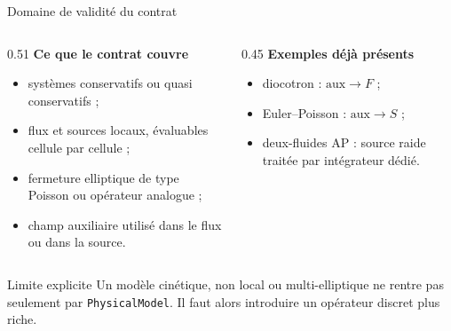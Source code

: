 \documentclass[10pt,aspectratio=169]{beamer}
\newcommand{\code}[1]{\texttt{\footnotesize #1}}
\begin{document}
\begin{frame}{Domaine de validité du contrat}
  \begin{columns}[T,onlytextwidth]
    \begin{column}{0.51\textwidth}
      \textbf{Ce que le contrat couvre}
      \begin{itemize}
        \item systèmes conservatifs ou quasi conservatifs ;
        \item flux et sources locaux, évaluables cellule par cellule ;
        \item fermeture elliptique de type Poisson ou opérateur analogue ;
        \item champ auxiliaire utilisé dans le flux ou dans la source.
      \end{itemize}
    \end{column}
    \begin{column}{0.45\textwidth}
      \textbf{Exemples déjà présents}
      \begin{itemize}
        \item diocotron : \(\mathrm{aux}\rightarrow F\) ;
        \item Euler--Poisson : \(\mathrm{aux}\rightarrow S\) ;
        \item deux-fluides AP : source raide traitée par intégrateur dédié.
      \end{itemize}
    \end{column}
  \end{columns}

  \vspace{0.35cm}
  \begin{block}{Limite explicite}
    Un modèle cinétique, non local ou multi-elliptique ne rentre pas seulement par
    \code{PhysicalModel}. Il faut alors introduire un opérateur discret plus riche.
  \end{block}
\end{frame}
\end{document}
